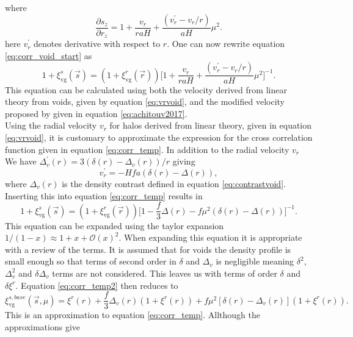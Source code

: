 where
\begin{equation}
    \frac{\partial s_z}{\partial r_z} = 1 + \frac{v_r}{raH}+\frac{(v_r^\prime-v_r/r)}{aH}\mu^2.
\end{equation}
here $v_r^\prime$ denotes derivative with respect to $r$. One can now rewrite
equation \ref{eq:corr_void_start} as
\begin{equation}\label{eq:corr_temp}
    1 + \xi^s_{\mathrm{vg}}(\vec{s})=(1 + \xi^r_{\mathrm{vg}}(\vec{r})) \Big[1 + \frac{v_r}{raH}+\frac{(v_r^\prime-v_r/r)}{aH}\mu^2 \Big]^{-1}.
\end{equation}
This equation can be calculated using both the velocity derived from linear theory from voids, given by equation \ref{eq:vrvoid}, and the modified velocity proposed by \cite{Achitouv_streaming} given in equation \ref{eq:achitouv2017}.
\\\indent
Using the radial velocity $v_r$ for halos derived from linear theory, given in equation \ref{eq:vrvoid}, it is customary to approximate the expression for the cross correlation function given in equation \ref{eq:corr_temp}. In addition to the radial velocity $v_r$ We have $\Delta_v^\prime(r)=3(\delta(r)-\Delta_v(r))/r$ giving
\begin{equation}
    v_r^\prime=-Hfa(\delta(r)-\Delta(r)),
\end{equation}
where $\Delta_v(r)$ is the density contrast defined in equation
\ref{eq:contrastvoid}. Inserting this into equation \ref{eq:corr_temp} results
in
\begin{equation}\label{eq:corr_temp2}
    1 + \xi^s_{\mathrm{vg}}(\vec{s})=(1 + \xi^r_{\mathrm{vg}}(\vec{r})) \Big[1 -\frac{f}{3}\Delta(r)-f\mu^2(\delta(r)-\Delta(r))\Big]^{-1}.
\end{equation}
This equation can be expanded using the taylor expansion
$1/(1-x)\approx1+x+\mathcal{O}(x)^2$. When expanding this equation it is
appropriate with a review of the terms. It is
assumed that for voids the density profile is small enough so that terms of
second order in $\delta$ and $\Delta_{v}$ is negligible meaning $\delta^2$,
$\Delta_{v}^2$ and $\delta\Delta_v$ terms are not considered. This leaves us with terms
of order $\delta$ and  $\delta\xi^r$. Equation
\ref{eq:corr_temp2} then reduces to
\begin{equation}\label{eq:corr_no_stream}
    \xi^{s,base}_{\mathrm{vg}}(\vec{s},\mu)=\xi^r(r)+\frac{f}{3}\Delta_v(r)(1+\xi^r(r))+f\mu^2[\delta(r)-\Delta_v(r)](1+\xi^r(r)).
\end{equation}
This is an approximation to equation \ref{eq:corr_temp}. Allthough the approximations give

